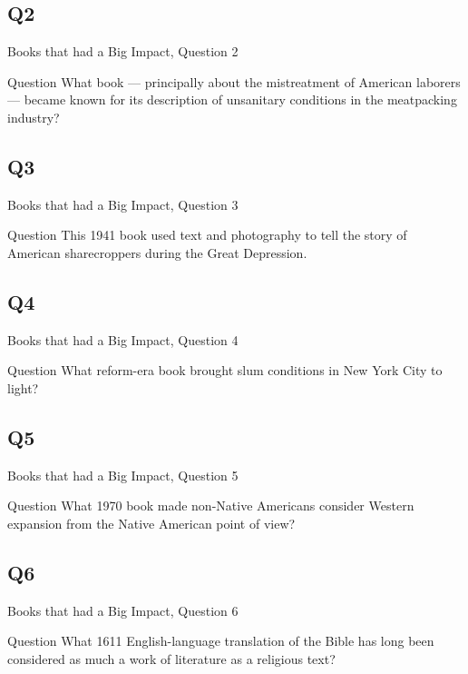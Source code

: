 \documentclass[11pt]{beamer}
\begin{document}
\subsection*{Q2}
\begin{frame}[t]{Books that had a Big Impact, Question 2}
\begin{block}{Question}
What book --- principally about the mistreatment of  American laborers --- became known for its description of unsanitary conditions in the meatpacking industry?
\end{block}
\end{frame}
\subsection*{Q3}
\begin{frame}[t]{Books that had a Big Impact, Question 3}
\begin{block}{Question}
This 1941 book used text and photography to tell the story of American sharecroppers during the Great Depression.
\end{block}
\end{frame}
\subsection*{Q4}
\begin{frame}[t]{Books that had a Big Impact, Question 4}
\begin{block}{Question}
What reform-era book brought slum conditions in New York City to light?
\end{block}
\end{frame}
\subsection*{Q5}
\begin{frame}[t]{Books that had a Big Impact, Question 5}
\begin{block}{Question}
What 1970 book made non-Native Americans consider Western expansion from the Native American point of view?
\end{block}
\end{frame}
\subsection*{Q6}
\begin{frame}[t]{Books that had a Big Impact, Question 6}
\begin{block}{Question}
What 1611 English-language translation of the Bible has long been considered as much a work of literature as a religious text?
\end{block}
\end{frame}
\end{document}

